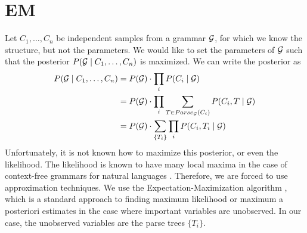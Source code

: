 \documentclass{article}
\begin{document}



\section{EM}

Let $C_1,\dots, C_n$ be independent samples from a grammar ${\mathcal G}$, for
which we know the structure, but not the parameters. We would like to
set the parameters of ${\mathcal G}$ such that the posterior $P({\mathcal G}\mid
C_1,\dots,C_n)$ is maximized. We can write the posterior as
\begin{align*}
  P({\mathcal G}\mid C_1,\dots, C_n) &= P({\mathcal G}) \cdot \prod_i P(C_i\mid {\mathcal G})\\
  &= P({\mathcal G}) \cdot \prod_i \sum_{T\in Parse_{{\mathcal G}}(C_i)}P(C_i, T \mid {\mathcal G})\\
  &= P({\mathcal G}) \cdot \sum_{\{T_i\}}\prod_i P(C_i, T_i \mid {\mathcal G})\\
\end{align*}
Unfortunately, it is not known how to maximize this posterior, or even
the likelihood. The likelihood is known to have many local maxima in
the case of context-free grammars for natural languages
\cite{charniak}. Therefore, we are forced to use approximation
techniques. We use the Expectation-Maximization algorithm \cite{em},
which is a standard approach to finding maximum likelihood or maximum
a posteriori estimates in the case where important variables are
unobserved. In our case, the unobserved variables are the parse trees
$\{T_i\}$.
\end{document}
